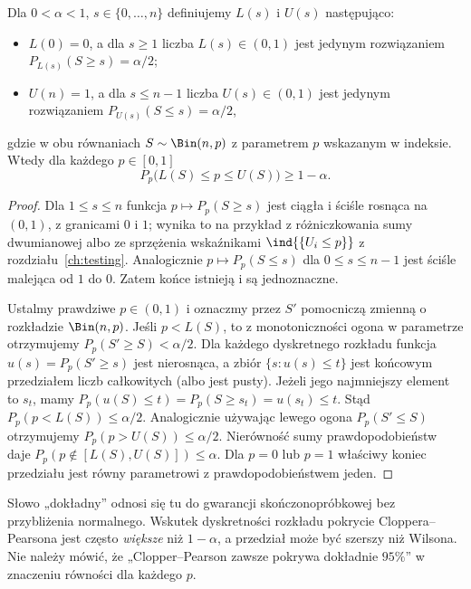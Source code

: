 \begin{twierdzenie}
\label{thm:clopper-pearson}
Dla $0<\alpha<1$, $s\in\{0,\ldots,n\}$ definiujemy
$L(s)$ i $U(s)$ następująco:
\begin{itemize}
\item $L(0)=0$, a dla $s\ge1$ liczba $L(s)\in(0,1)$
jest jedynym rozwiązaniem $P_{L(s)}(S\ge s)=\alpha/2$;
\item $U(n)=1$, a dla $s\le n-1$ liczba $U(s)\in(0,1)$
jest jedynym rozwiązaniem $P_{U(s)}(S\le s)=\alpha/2$,
\end{itemize}
gdzie w obu równaniach $S\sim\Bin(n,p)$ z parametrem
$p$ wskazanym w indeksie. Wtedy dla każdego $p\in[0,1]$
\[
 P_p\bigl(L(S)\le p\le U(S)\bigr)\ge1-\alpha.
\]
\end{twierdzenie}
\begin{proof}
Dla $1\le s\le n$ funkcja
$p\mapsto P_p(S\ge s)$ jest ciągła i ściśle rosnąca
na $(0,1)$, z granicami $0$ i $1$; wynika to na przykład
z różniczkowania sumy dwumianowej albo ze sprzężenia
wskaźnikami $\ind{\{U_i\le p\}}$ z rozdziału~\ref{ch:testing}.
Analogicznie $p\mapsto P_p(S\le s)$ dla
$0\le s\le n-1$ jest ściśle malejąca od $1$ do $0$.
Zatem końce istnieją i są jednoznaczne.

Ustalmy prawdziwe $p\in(0,1)$ i oznaczmy przez
$S'$ pomocniczą zmienną o rozkładzie $\Bin(n,p)$.
Jeśli $p<L(S)$, to z monotoniczności ogona w parametrze
otrzymujemy $P_p(S'\ge S)<\alpha/2$.
Dla każdego dyskretnego rozkładu funkcja
$u(s)=P_p(S'\ge s)$ jest nierosnąca, a zbiór
$\{s:u(s)\le t\}$ jest końcowym przedziałem liczb
całkowitych (albo jest pusty). Jeżeli jego najmniejszy
element to $s_t$, mamy
$P_p(u(S)\le t)=P_p(S\ge s_t)=u(s_t)\le t$.
Stąd $P_p(p<L(S))\le\alpha/2$.
Analogicznie używając lewego ogona $P_p(S'\le S)$
otrzymujemy $P_p(p>U(S))\le\alpha/2$.
Nierówność sumy prawdopodobieństw daje
$P_p(p\notin[L(S),U(S)])\le\alpha$.
Dla $p=0$ lub $p=1$ właściwy koniec przedziału jest
równy parametrowi z prawdopodobieństwem jeden.
\end{proof}

\begin{uwaga}
Słowo „dokładny” odnosi się tu do gwarancji skończonopróbkowej
bez przybliżenia normalnego. Wskutek dyskretności rozkładu
pokrycie Cloppera--Pearsona jest często \emph{większe} niż
$1-\alpha$, a przedział może być szerszy niż Wilsona.
Nie należy mówić, że „Clopper--Pearson zawsze pokrywa dokładnie
$95\%$” w znaczeniu równości dla każdego $p$.
\end{uwaga}

